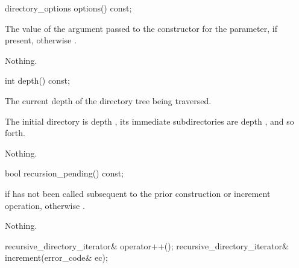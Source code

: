 %
\begin{itemdecl}
directory_options options() const;
\end{itemdecl}

\begin{itemdescr}
\pnum
\returns
The value of the argument passed to the constructor for the
 parameter, if present, otherwise
.

\pnum
\throws
Nothing.
\end{itemdescr}

%
\begin{itemdecl}
int depth() const;
\end{itemdecl}

\begin{itemdescr}
\pnum
\returns
The current depth of the directory tree being traversed.
\begin{note}
  The initial directory is depth , its immediate subdirectories are depth ,
  and so forth.
\end{note}

\pnum
\throws
Nothing.
\end{itemdescr}

%
\begin{itemdecl}
bool recursion_pending() const;
\end{itemdecl}

\begin{itemdescr}
\pnum
\returns
{} if 
  has not been called subsequent to the prior construction or increment
  operation, otherwise .

\pnum
\throws
Nothing.
\end{itemdescr}

%
%
\begin{itemdecl}
recursive_directory_iterator& operator++();
recursive_directory_iterator& increment(error_code& ec);
\end{itemdecl}

